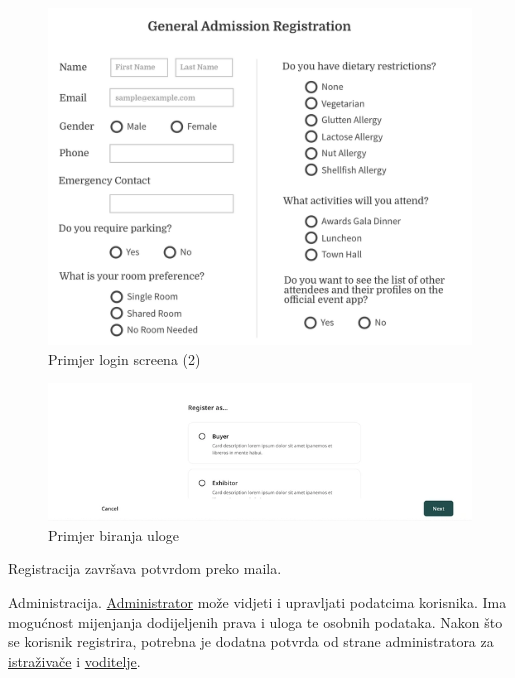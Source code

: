 \begin{packed_item}
		\begin{figure}[H]
			\includegraphics[scale=0.2]{slike/login_screen2.PNG} %
			\centering
			\caption{Primjer login screena (2)}
			\label{fig:promjene}
		\end{figure}
		
		\begin{figure}[H]
			\includegraphics[scale=0.9]{slike/biranje_uloge.PNG} %
			\centering
			\caption{Primjer biranja uloge}
			\label{fig:promjene}
		\end{figure}


Registracija završava potvrdom preko maila.\\

\item[2)] Administracija. \underline{Administrator} može vidjeti i upravljati podatcima korisnika. Ima mogućnost mijenjanja dodijeljenih prava i uloga te osobnih podataka. Nakon što se korisnik registrira, potrebna je dodatna potvrda od strane administratora za \underline{istraživače} i \underline{voditelje}.\\



\end{packed_item}
